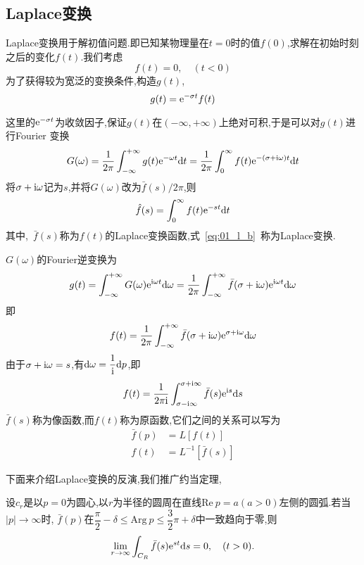 \subsection{Laplace变换}
Laplace变换用于解初值问题.即已知某物理量在$t=0$时的值$f(0)$,求解在初始时刻之后的变化$f(t)$.我们考虑
\begin{equation}
 f(t)=0,\quad (t<0)
\end{equation}
为了获得较为宽泛的变换条件,构造$g(t)$,
\begin{equation}
 g(t)=\mathrm{e}^{-\sigma t}f(t)
\end{equation}\par
这里的$\mathrm{e}^{-\sigma t}$为收敛因子,保证$g(t)$在$(-\infty,+\infty)$上绝对可积,于是可以对$g(t)$进行Fourier
变换
\begin{equation*}
G(\omega)=\dfrac{1}{2\pi}\int_{-\infty}^{+\infty} g(t)\mathrm{e}^{-\omega t}\mathrm{d} t=
\dfrac{1}{2\pi}\int_{0}^{\infty}f(t)\mathrm{e}^{-(\sigma+\mathrm{i}\omega)t}\mathrm{d} t
\end{equation*}
将$\sigma+\mathrm{i}\omega$记为$s$,并将$G(\omega)$改为$\bar{f}(s)/2\pi$,则
\begin{equation}\label{eq:01_l_b}
 \hat{f}(s)=\int_{0}^{\infty}f(t)\mathrm{e}^{-st}\mathrm{d} t
\end{equation}
其中,~$\bar{f}(s)$称为$f(t)$的Laplace变换函数,式~\eqref{eq:01_l_b}~称为Laplace变换.\par
$G(\omega)$的Fourier逆变换为
\begin{equation*}
 g(t)=\int_{-\infty}^{+\infty}G(\omega)\mathrm{e}^{\mathrm{i}\omega t}\mathrm{d}\omega
     =\dfrac{1}{2\pi}\int_{-\infty}^{+\infty}\bar{f}(\sigma+\mathrm{i}\omega)\mathrm{e}^{\mathrm{i}\omega t}\mathrm{d}\omega
\end{equation*}
即
\begin{equation}
f(t)=\dfrac{1}{2\pi}\int_{-\infty}^{+\infty}\bar{f}(\sigma+\mathrm{i}\omega)\mathrm{e}^{\sigma+\mathrm{i}\omega}\mathrm{d}\omega
\end{equation}
由于$\sigma+\mathrm{i}\omega=s$,有$\mathrm{d}\omega=\dfrac{1}{\mathrm{i}}\mathrm{d} p$,即
\begin{equation}
 f(t)=\dfrac{1}{2\pi\mathrm{i}}\int_{\sigma-\mathrm{i}\infty}^{\sigma+\mathrm{i}\infty}\bar{f}(s)\mathrm{e}^{\mathrm{i} s}\mathrm{d} s
\end{equation}
$\bar{f}(s)$称为像函数,而$f(t)$称为原函数,它们之间的关系可以写为
\begin{align}
 \bar{f}(p)&=L[f(t)]  \\
 f(t)&=L^{-1}[\bar{f}(s)]
\end{align}\par
下面来介绍Laplace变换的反演,我们推广约当定理,
\begin{Theorem}[推广的约当定理]
 设$c_r$是以$p=0$为圆心,以$r$为半径的圆周在直线$\mathrm{Re}\ p=a(a>0)$左侧的圆弧.若当$|p|\to\infty$时,
 $\bar{f}(p)$在$\dfrac{\pi}{2}-\delta\leq \mathrm{Arg}\ p\leq\dfrac{3}{2}\pi+\delta$中一致趋向于零,则
 \begin{equation}\label{eq:01_l_yd}
  \lim_{r\to\infty}\int_{C_R}\bar{f}(s)\mathrm{e}^{st}\mathrm{d} s=0,\quad (t>0).
 \end{equation}
\end{Theorem}\par
